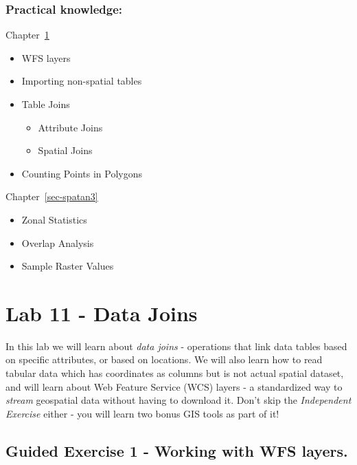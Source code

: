 \documentclass[
  letterpaper,
  DIV=11,
  numbers=noendperiod]{scrreprt}
\providecommand{\tightlist}{%
  \setlength{\itemsep}{0pt}\setlength{\parskip}{0pt}}\usepackage{longtable,booktabs,array}
\begin{document}
\subsection*{Practical knowledge:}\label{practical-knowledge-5}

Chapter~\ref{sec-spatan2}

\begin{itemize}
\tightlist
\item
  WFS layers
\item
  Importing non-spatial tables
\item
  Table Joins

  \begin{itemize}
  \tightlist
  \item
    Attribute Joins
  \item
    Spatial Joins
  \end{itemize}
\item
  Counting Points in Polygons
\end{itemize}

Chapter~\ref{sec-spatan3}

\begin{itemize}
\tightlist
\item
  Zonal Statistics
\item
  Overlap Analysis
\item
  Sample Raster Values
\end{itemize}

\chapter{Lab 11 - Data Joins}\label{sec-spatan2}

In this lab we will learn about \emph{data joins} - operations that link
data tables based on specific attributes, or based on locations. We will
also learn how to read tabular data which has coordinates as columns but
is not actual spatial dataset, and will learn about Web Feature Service
(WCS) layers - a standardized way to \emph{stream} geospatial data
without having to download it. Don't skip the \emph{Independent
Exercise} either - you will learn two bonus GIS tools as part of it!

\section{Guided Exercise 1 - Working with WFS
layers.}\label{guided-exercise-1---working-with-wfs-layers.}
\end{document}
